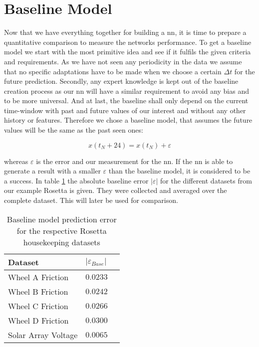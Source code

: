 \section{Baseline Model}
Now that we have everything together for building a \ac{nn}, it is time to prepare a quantitative comparison to measure the networks performance. \newline
To get a baseline model we start with the most primitive idea and see if it fulfils the given criteria and requirements. As we have not seen any periodicity in the data we assume that no specific adaptations have to be made when we choose a certain $\Delta t$ for the future prediction. Secondly, any expert knowledge is kept out of the baseline creation process as our \ac{nn} will have a similar requirement to avoid any bias and to be more universal. And at last, the baseline shall only depend on the current time-window with past and future values of our interest and without any other history or features. Therefore we chose a baseline model, that assumes the future values will be the same as the past seen ones:

\begin{equation}
x(t_N + 24) = x(t_N) + \varepsilon
\end{equation}

whereas $\varepsilon$ is the error and our measurement for the \ac{nn}. If the \ac{nn} is able to generate a result with a smaller $\varepsilon$ than the baseline model, it is considered to be a success.\newline
In table \ref{t:baseline_error} the absolute baseline error $| \varepsilon |$ for the different datasets from our example Rosetta is given. They were collected and averaged over the complete dataset. This will later be used for comparison.

\begin{table}[htb]
\centering
\caption{Baseline model prediction error for the respective Rosetta housekeeping datasets}
\begin{tabular}{lll}
\toprule
Dataset				& $| \varepsilon_{Base} |$ \\ \midrule
Wheel A Friction		& $\num{0.0233}$		\\
Wheel B Friction		& $\num{0.0242}$		\\
Wheel C Friction		& $\num{0.0266}$		\\
Wheel D Friction		& $\num{0.0300}$		\\
Solar Array Voltage	& $\num{0.0065}$		\\
\bottomrule
\end{tabular}
\label{t:baseline_error}
\end{table}
		
